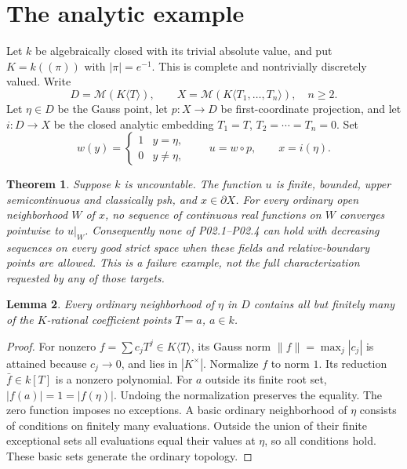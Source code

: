 \documentclass[11pt]{article}
\newtheorem{theorem}{Theorem}
\newtheorem{lemma}[theorem]{Lemma}
\begin{document}
\section{The analytic example}
Let $k$ be algebraically closed with its trivial absolute value, and put
$K=k((\pi))$ with $|\pi|=e^{-1}$. This is complete and nontrivially
discretely valued. Write
\[
D=\mathcal M(K\langle T\rangle),\qquad
X=\mathcal M(K\langle T_1,\ldots,T_n\rangle),\quad n\ge2.
\]
Let $\eta\in D$ be the Gauss point, let $p:X\to D$ be first-coordinate
projection, and let $i:D\to X$ be the closed analytic embedding
$T_1=T$, $T_2=\cdots=T_n=0$. Set
\[
w(y)=\begin{cases}1&y=\eta,\\0&y\ne\eta,\end{cases}
\qquad u=w\circ p,\qquad x=i(\eta).
\]

\begin{theorem}\label{thm:obstruction}
Suppose $k$ is uncountable. The function $u$ is finite, bounded, upper
semicontinuous and classically psh, and $x\in\partial X$. For every
ordinary open neighborhood $W$ of $x$, no sequence of continuous real
functions on $W$ converges pointwise to $u|_W$. Consequently none of
P02.1--P02.4 can hold with decreasing sequences on every good strict
space when these fields and relative-boundary points are allowed.
This is a failure example, not the full characterization requested by
any of those targets.
\end{theorem}

\begin{lemma}\label{lem:cofinite}
Every ordinary neighborhood of $\eta$ in $D$ contains all but finitely
many of the $K$-rational coefficient points $T=a$, $a\in k$.
\end{lemma}
\begin{proof}
For nonzero $f=\sum c_jT^j\in K\langle T\rangle$, its Gauss norm
$\|f\|=\max_j|c_j|$ is attained because $c_j\to0$, and lies in
$|K^\times|$. Normalize $f$ to norm $1$. Its reduction $\bar f\in k[T]$
is a nonzero polynomial. For $a$ outside its finite root set,
$|f(a)|=1=|f(\eta)|$. Undoing the normalization preserves the equality.
The zero function imposes no exceptions. A basic ordinary neighborhood
of $\eta$ consists of conditions on finitely many evaluations. Outside
the union of their finite exceptional sets all evaluations equal their
values at $\eta$, so all conditions hold. These basic sets generate the
ordinary topology.
\end{proof}
\end{document}
